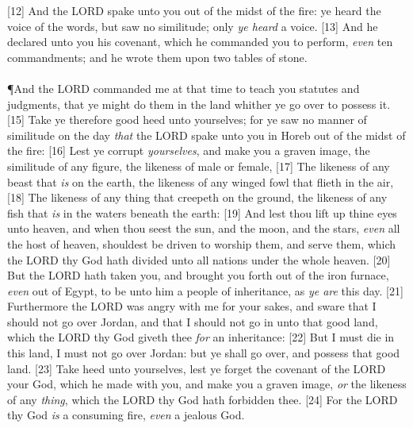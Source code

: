 [12] \textcolor[rgb]{0.00,0.00,1.00}{And the LORD spake unto you out of the midst of the fire: ye heard the voice of the words, but saw no similitude; only \emph{ye heard} a voice.}
[13] \textcolor[rgb]{0.00,0.00,1.00}{And he declared unto you his covenant, which he commanded you to perform, \emph{even} ten commandments; and he wrote them upon two tables of stone.}\\
\\
\P \textcolor[rgb]{0.00,0.00,1.00}{And the LORD commanded me at that time to teach you statutes and judgments, that ye might do them in the land whither ye go over to possess it.}
[15] \textcolor[rgb]{0.00,0.00,1.00}{Take ye therefore good heed unto yourselves; for ye saw no manner of similitude on the day \emph{that} the LORD spake unto you in Horeb out of the midst of the fire:}
[16] \textcolor[rgb]{0.00,0.00,1.00}{Lest ye corrupt \emph{yourselves}, and make you a graven image, the similitude of any figure, the likeness of male or female,}
[17] \textcolor[rgb]{0.00,0.00,1.00}{The likeness of any beast that \emph{is} on the earth, the likeness of any winged fowl that flieth in the air,}
[18] \textcolor[rgb]{0.00,0.00,1.00}{The likeness of any thing that creepeth on the ground, the likeness of any fish that \emph{is} in the waters beneath the earth:}
[19] \textcolor[rgb]{0.00,0.00,1.00}{And lest thou lift up thine eyes unto heaven, and when thou seest the sun, and the moon, and the stars, \emph{even} all the host of heaven, shouldest be driven to worship them, and serve them, which the LORD thy God hath divided unto all nations under the whole heaven.}
[20] \textcolor[rgb]{0.00,0.00,1.00}{But the LORD hath taken you, and brought you forth out of the iron furnace, \emph{even} out of Egypt, to be unto him a people of inheritance, as \emph{ye are} this day.}
[21] \textcolor[rgb]{0.00,0.00,1.00}{Furthermore the LORD was angry with me for your sakes, and sware that I should not go over Jordan, and that I should not go in unto that good land, which the LORD thy God giveth thee \emph{for} an inheritance:}
[22] \textcolor[rgb]{0.00,0.00,1.00}{But I must die in this land, I must not go over Jordan: but ye shall go over, and possess that good land.}
[23] \textcolor[rgb]{0.00,0.00,1.00}{Take heed unto yourselves, lest ye forget the covenant of the LORD your God, which he made with you, and make you a graven image, \emph{or} the likeness of any \emph{thing}, which the LORD thy God hath forbidden thee.}
[24] \textcolor[rgb]{0.00,0.00,1.00}{For the LORD thy God \emph{is} a consuming fire, \emph{even} a jealous God.}\\
